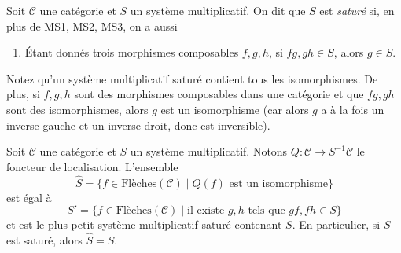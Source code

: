 \begin{definition}
\label{definition-saturated-multiplicative-system}
Soit $\mathcal{C}$ une catégorie et $S$ un système multiplicatif. On dit que
$S$ est {\it saturé} si, en plus de MS1, MS2, MS3, on a aussi
\begin{enumerate}
\item[MS4] Étant donnés trois morphismes composables $f, g, h$, si $fg, gh \in S$, alors $g \in S$.
\end{enumerate}
\end{definition}

\noindent
Notez qu'un système multiplicatif saturé contient tous les isomorphismes. De
plus, si $f, g, h$ sont des morphismes composables dans une catégorie et que
$fg, gh$ sont des isomorphismes, alors $g$ est un isomorphisme (car alors $g$
a à la fois un inverse gauche et un inverse droit, donc est inversible).

\begin{lemma}
\label{lemma-what-gets-inverted}
Soit $\mathcal{C}$ une catégorie et $S$ un système multiplicatif. Notons $Q : \mathcal{C} \to S^{-1}\mathcal{C}$ le foncteur de localisation. L'ensemble
$$
\hat S = \{f \in \text{Flèches}(\mathcal{C}) \mid
Q(f) \text{ est un isomorphisme}\}
$$
est égal à
$$
S' = \{f \in \text{Flèches}(\mathcal{C}) \mid
\text{il existe }g, h\text{ tels que }gf, fh \in S\}
$$
et est le plus petit système multiplicatif saturé contenant $S$. En
particulier, si $S$ est saturé, alors $\hat S = S$.
\end{lemma}

